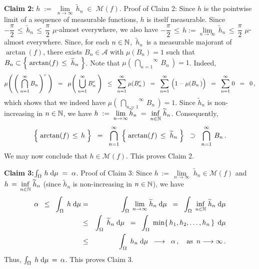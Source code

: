 \vskip 0.8cm
\noindent
\textbf{Claim 2:}\quad
$h \; := \; \underset{n\rightarrow\infty}{\lim}\,\widetilde{h}_{n} \; \in \; \mathcal{M}(f)$.
\vskip 0.1cm
\noindent
Proof of Claim 2:\;\;
Since $h$ is the pointwise limit of a sequence of measurable functions, $h$ is itself measurable.
Since \;$-\dfrac{\pi}{2} \, \leq \, \widetilde{h}_{n} \, \leq \, \dfrac{\pi}{2}$\; $\mu$-almost everywhere, we also have
\;$-\dfrac{\pi}{2} \, \leq \, h := \underset{n\rightarrow\infty}{\lim} \, \widetilde{h}_{n} \, \leq \, \dfrac{\pi}{2}$\; $\mu$-almost everywhere.
Since, for each $n \in \mathbb{N}$, \,$\widetilde{h}_{n}$\, is a measurable majorant of $\arctan(f)$, there exists
$B_{n} \in \mathcal{A}$ with $\mu(B_{n}) = 1$ such that
$B_{n} \subset \left\{\;\arctan(f) \,\overset{{\color{white}.}}{\leq}\; \widetilde{h}_{n}\;\right\}$.
Note that $\mu\!\left(\,\overset{\infty}{\underset{n=1}{\bigcap}}\,B_{n}\,\right) = 1$.
Indeed,
\begin{equation*}
\mu\!\left(\,\left(\;\overset{\infty}{\underset{n=1}{\bigcap}}\,B_{n}\,\right)^{c}\;\right)
\;\; = \;\;
	\mu\!\left(\;\overset{\infty}{\underset{n=1}{\bigcup}}\,B_{n}^{c}\;\right)
\;\; \leq \;\;
	\overset{\infty}{\underset{n=1}{\sum}}\;\mu\!\left(B_{n}^{c}\,\right)
\;\; = \;\;
	\overset{\infty}{\underset{n=1}{\sum}}\,\left(1 \overset{{\color{white}.}}{-} \mu\!\left(B_{n}\,\right)\right)
\;\; = \;\;
	\overset{\infty}{\underset{n=1}{\sum}}\;0
\;\; = \;\;
	0\,,
\end{equation*}
which shows that we indeed have $\mu\!\left(\,\overset{\infty}{\underset{n=1}{\bigcap}}\,B_{n}\,\right) = 1$.
Since $\widetilde{h}_{n}$ is non-increasing in $n \in \mathbb{N}$, we have
$h \; := \; \underset{n\rightarrow\infty}{\lim}\,\widetilde{h}_{n} \; = \; \underset{n\in\mathbb{N}}{\inf}\;\widetilde{h}_{n}$.
Consequently,
\begin{equation*}
\left\{\;\arctan(f) \,\overset{{\color{white}.}}{\leq}\, h\;\right\}
\;\; = \;\;
	\bigcap_{n=1}^{\infty}\,\left\{\;\arctan(f) \,\overset{{\color{white}.}}{\leq}\; \widetilde{h}_{n}\;\right\}
\;\; \supset \;\;
	\bigcap_{n=1}^{\infty}\,B_{n}\,.
\end{equation*}
We may now conclude that $h \in \mathcal{M}(f)$. This proves Claim 2.

\vskip 0.8cm
\noindent
\textbf{Claim 3:}\quad $\int_{\Omega}\, h \; \textnormal{d}\mu \; = \; \alpha$.
\vskip 0.1cm
\noindent
Proof of Claim 3:\;\;
Since $h \,:=\, \underset{n\rightarrow\infty}{\lim}\;\widetilde{h}_{n} \in \mathcal{M}(f)$ and
$h \,=\, \underset{n\in\mathbb{N}}{\inf}\;\widetilde{h}_{n}$ (since $\widetilde{h}_{n}$ is non-increasing in $n \in \mathbb{N}$),
we have
\begin{eqnarray*}
\alpha
\;\;\leq\;\;
	\int_{\Omega}\;h\;\textnormal{d}\mu
&=&
	\int_{\Omega}\;\underset{n\rightarrow\infty}{\lim}\;\widetilde{h}_{n}\;\textnormal{d}\mu
\;\;=\;\;
	\int_{\Omega}\;\underset{n\in\mathbb{N}}{\inf}\;\widetilde{h}_{n}\;\textnormal{d}\mu
\\
&\leq&
	\int_{\Omega}\;\widetilde{h}_{n}\;\textnormal{d}\mu
\;\;=\;\;
	\int_{\Omega}\;\min\!\left\{\,h_{1},h_{2},\ldots,h_{n}\,\right\}\;\textnormal{d}\mu
\\
&\leq&
	\int_{\Omega}\;h_{n}\;\textnormal{d}\mu
\;\;\longrightarrow\;\;
	\alpha\,,
	\quad
	\textnormal{as \,$n \longrightarrow \infty$}\,.
\end{eqnarray*}
Thus, \;$\int_{\Omega}\;h\;\textnormal{d}\mu \,=\, \alpha$.\; This proves Claim 3.

